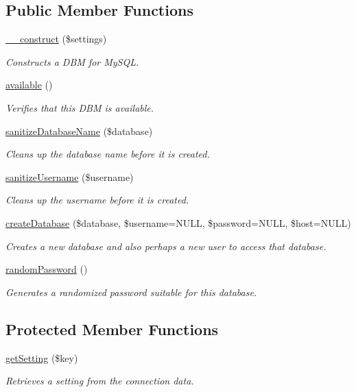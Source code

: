 \subsection*{Public Member Functions}
\begin{DoxyCompactItemize}
\item 
\hyperlink{classMySqlDBM_a0186cb79b1549f614b3095b6e34b754a}{\-\_\-\-\_\-construct} (\$settings)
\begin{DoxyCompactList}\small\item\em Constructs a D\-B\-M for My\-S\-Q\-L. \end{DoxyCompactList}\item 
\hyperlink{classMySqlDBM_a7825183a0e5c0db83d65f69afd284005}{available} ()
\begin{DoxyCompactList}\small\item\em Verifies that this D\-B\-M is available. \end{DoxyCompactList}\item 
\hyperlink{classMySqlDBM_afcfca1d07e8fe8ba73b21c7a41c9d8cd}{sanitize\-Database\-Name} (\$database)
\begin{DoxyCompactList}\small\item\em Cleans up the database name before it is created. \end{DoxyCompactList}\item 
\hyperlink{classMySqlDBM_ac59dfbf9d93fef330016e8b26b157eb6}{sanitize\-Username} (\$username)
\begin{DoxyCompactList}\small\item\em Cleans up the username before it is created. \end{DoxyCompactList}\item 
\hyperlink{classMySqlDBM_a95c69c660d9137f2ad738c00f76efbba}{create\-Database} (\$database, \$username=N\-U\-L\-L, \$password=N\-U\-L\-L, \$host=N\-U\-L\-L)
\begin{DoxyCompactList}\small\item\em Creates a new database and also perhaps a new user to access that database. \end{DoxyCompactList}\item 
\hyperlink{classGenericDBM_a4cd49851039d573019ad0f025766297d}{random\-Password} ()
\begin{DoxyCompactList}\small\item\em Generates a randomized password suitable for this database. \end{DoxyCompactList}\end{DoxyCompactItemize}
\subsection*{Protected Member Functions}
\begin{DoxyCompactItemize}
\item 
\hyperlink{classGenericDBM_a539a8700a6814ac460697aef3b7828d1}{get\-Setting} (\$key)
\begin{DoxyCompactList}\small\item\em Retrieves a setting from the connection data. \end{DoxyCompactList}\end{DoxyCompactItemize}
